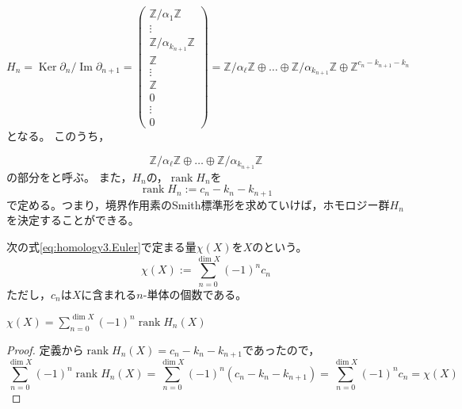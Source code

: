 \documentclass[uplatex]{jsarticle}
\DeclareMathOperator{\Image}{Im}
\DeclareMathOperator{\Kernel}{Ker}
\DeclareMathOperator{\rank}{rank}
\begin{document}
\begin{equation}
  H_{n} = \Kernel \partial_{n} / \Image \partial_{n+1}
  = \begin{pmatrix}
    \mathbb{Z} / \alpha_{1} \mathbb{Z} \\ \vdots \\ \mathbb{Z} / \alpha_{k_{n+1}} \mathbb{Z} \\ \mathbb{Z} \\ \vdots \\ \mathbb{Z} \\ 0 \\ \vdots \\ 0
  \end{pmatrix}
  = \mathbb{Z} / \alpha_{\ell} \mathbb{Z} \oplus \dots \oplus \mathbb{Z} / \alpha_{k_{n+1}} \mathbb{Z} \oplus \mathbb{Z}^{c_{n} - k_{n+1} - k_{n}}
\end{equation}
となる。
このうち，

\begin{equation}
  \mathbb{Z} / \alpha_{\ell} \mathbb{Z} \oplus \dots \oplus \mathbb{Z} / \alpha_{k_{n+1}} \mathbb{Z}
\end{equation}
の部分をと呼ぶ。
また，$H_{n}$の，$\rank H_{n}$を
\begin{equation}
  \rank H_{n} := c_{n} - k_{n} - k_{n+1}
\end{equation}
で定める。つまり，境界作用素のSmith標準形を求めていけば，ホモロジー群$H_{n}$を決定することができる。

\sukima {}

\begin{teigi}
  次の式\eqref{eq:homology3.Euler}で定まる量$\chi (X)$を$X$のという。
  \begin{equation}
    \label{eq:homology3.Euler}
    \chi (X) := \sum_{n=0}^{\dim X} (-1)^{n} c_{n}
  \end{equation}
  ただし，$c_{n}$は$X$に含まれる$n$-単体の個数である。
\end{teigi}

\begin{prop}
  ${\displaystyle \chi (X) = \sum_{n=0}^{\dim X} (-1)^{n} \rank H_{n} (X)}$
\end{prop}

\begin{proof}
  定義から$\rank H_{n} (X) = c_{n} - k_{n} - k_{n+1}$であったので，
  \begin{equation}
    \sum_{n=0}^{\dim X} (-1)^{n} \rank H_{n} (X) = \sum_{n=0}^{\dim X} (-1)^{n} (c_{n} - k_{n} - k_{n+1}) = \sum_{n=0}^{\dim X} (-1)^{n} c_{n} = \chi (X)
  \end{equation}
\end{proof}
\end{document}
